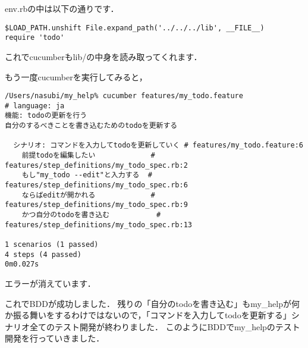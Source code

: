 env.rbの中は以下の通りです．
\begin{lstlisting}[style=customRuby,basicstyle={\scriptsize\ttfamily}]
$LOAD_PATH.unshift File.expand_path('../../../lib', __FILE__)
require 'todo'
\end{lstlisting}
これでcucumberもlib/の中身を読み取ってくれます．

もう一度cucumberを実行してみると，
\begin{lstlisting}[style=customCsh,basicstyle={\scriptsize\ttfamily}]
/Users/nasubi/my_help% cucumber features/my_todo.feature 
# language: ja
機能: todoの更新を行う
自分のするべきことを書き込むためのtodoを更新する

  シナリオ: コマンドを入力してtodoを更新していく # features/my_todo.feature:6
    前提todoを編集したい             # features/step_definitions/my_todo_spec.rb:2
    もし"my_todo --edit"と入力する  # features/step_definitions/my_todo_spec.rb:6
    ならばeditが開かれる             # features/step_definitions/my_todo_spec.rb:9
    かつ自分のtodoを書き込む           # features/step_definitions/my_todo_spec.rb:13

1 scenarios (1 passed)
4 steps (4 passed)
0m0.027s
\end{lstlisting}
エラーが消えています．

これでBDDが成功しました．
残りの「自分のtodoを書き込む」もmy\_helpが何か振る舞いをするわけではないので，「コマンドを入力してtodoを更新する」シナリオ全てのテスト開発が終わりました．
このようにBDDでmy\_helpのテスト開発を行っていきました．

